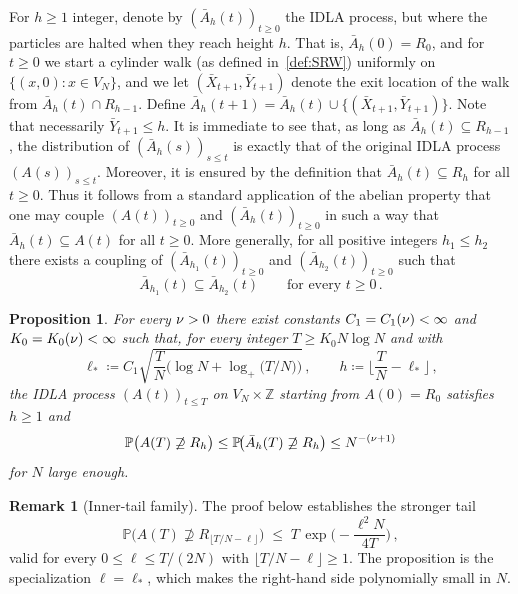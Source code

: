 \documentclass[11pt,a4paper,reqno]{amsart}
\newtheorem{Proposition}[Theorem]{Proposition}
\theoremstyle{definition}
\newtheorem{Remark}[Theorem]{Remark}
\newcommand{\bbP}{{\ensuremath{\mathbb P}} }
\newcommand{\bbZ}{{\ensuremath{\mathbb Z}} }
\begin{document}
For $h \geq 1$ integer, denote by $(\bar A_h(t))_{t \geq 0}$ the IDLA process, but where the particles are halted when they reach height $h$. That is, $\bar A_h(0) = R_0$, and for $t \geq 0$ we start a cylinder walk (as defined in~\eqref{def:SRW}) uniformly on
$\{ (x,0) : x \in V_N \}$, and we let $(\bar X_{t+1}, \bar Y_{t+1})$ denote the
exit location of the walk
from  $\bar A_h(t) \cap R_{h-1}$.  Define $\bar A_h(t+1) = \bar A_h(t) \cup \{ (\bar X_{t+1}, \bar Y_{t+1}) \}$. Note that necessarily $\bar Y_{t+1} \leq h$. 
It is immediate to see that, as long as $\bar A_h(t) \subseteq R_{h-1}$, the distribution of $(\bar A_h(s))_{s \leq t}$
is exactly that of the original IDLA process $(A(s))_{s \leq t}$. Moreover, it is ensured by the definition
that $\bar A_h(t) \subseteq R_h$ for all $t\geq 0$.
Thus it follows from a standard application of the abelian property that one may couple $(A(t))_{t\geq 0}$ and $(\bar A_h(t))_{t \geq 0}$ in such a way that $\bar A_h(t) \subseteq A(t)$ for all $t \geq 0$. More generally, for all positive integers $h_1 \leq h_2$ there exists a coupling of $(\bar A_{h_1}(t))_{t\geq 0}$ and $(\bar A_{h_2}(t))_{t\geq 0}$ such that
\begin{equation}\label{eq:monotone_stop}
	\bar A_{h_1}(t) \subseteq \bar A_{h_2}(t) \qquad \text{for every } t \geq 0\,.
\end{equation}

\begin{Proposition}\label{pr:inner}
For every $\nu > 0$ there exist constants $C_1 = C_1(\nu) < \infty$ and $K_0 = K_0(\nu) < \infty$ such that, for every integer $T \geq K_0 N\log N$ and with
	\[ \ell_* \coloneqq C_1 \sqrt{\frac{T}{N}\Big( \log N + \log_+\!\big(T/N\big)\Big)}\,, \qquad h \coloneqq \Big\lfloor \frac{T}{N} - \ell_* \Big\rfloor\,, \]
the IDLA process $(A(t))_{t \leq T}$ on $V_N \times \bbZ$ starting from $A(0) = R_0$ satisfies $h \geq 1$ and
	\[ \bbP \big( A(T) \not\supseteq R_h \big) \leq \bbP\!\big( \bar A_h(T) \not\supseteq R_h \big) \leq N^{-(\n+1)} \]
for $N$ large enough.
\end{Proposition}

\begin{Remark}[Inner-tail family]\label{rk:inner-tail}
The proof below establishes the stronger tail 
	\[ \bbP\!\big( A(T) \not\supseteq R_{\lfloor T/N - \ell \rfloor} \big) \;\leq\; T\, \exp\!\Big(\! -\frac{\ell^2 N}{4T}\Big)\,, \]
valid for every $0 \leq \ell \leq T/(2N)$ with $\lfloor T/N - \ell\rfloor \geq 1$. The proposition is the specialization $\ell = \ell_*$, which makes the right-hand side polynomially small in $N$.
\end{Remark}
\end{document}
